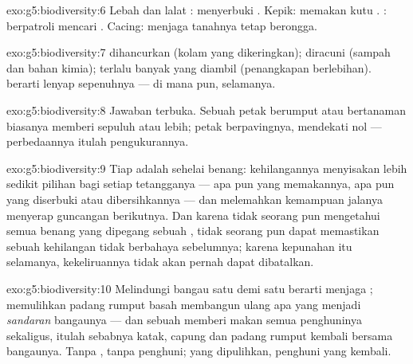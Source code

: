 \begin{solution}{exo:g5:biodiversity:6}
Lebah dan lalat : menyerbuki . Kepik: memakan kutu
. : berpatroli mencari . Cacing: menjaga tanahnya
tetap berongga.
\end{solution}

\begin{solution}{exo:g5:biodiversity:7}
 dihancurkan (kolam yang dikeringkan); 
diracuni (sampah dan bahan kimia); terlalu banyak yang diambil
(penangkapan  berlebihan).  berarti lenyap sepenuhnya ---
di mana pun, selamanya.
\end{solution}

\begin{solution}{exo:g5:biodiversity:8}
Jawaban terbuka. Sebuah petak berumput atau bertanaman biasanya
memberi sepuluh  atau lebih; petak berpavingnya, mendekati nol
--- perbedaannya itulah pengukurannya.
\end{solution}

\begin{solution}{exo:g5:biodiversity:9}
Tiap  adalah sehelai benang: kehilangannya menyisakan lebih
sedikit pilihan bagi setiap tetangganya --- apa pun yang memakannya,
apa pun yang diserbuki atau dibersihkannya --- dan melemahkan
kemampuan jalanya menyerap guncangan berikutnya. Dan karena tidak
seorang pun mengetahui semua benang yang dipegang sebuah ,
tidak seorang pun dapat memastikan sebuah kehilangan tidak berbahaya
sebelumnya; karena kepunahan itu selamanya, kekeliruannya tidak akan
pernah dapat dibatalkan.
\end{solution}

\begin{solution}{exo:g5:biodiversity:10}
Melindungi bangau satu demi satu berarti menjaga ; memulihkan
padang rumput basah membangun ulang apa yang menjadi \emph{sandaran}
bangaunya --- dan sebuah  memberi makan semua penghuninya
sekaligus, itulah sebabnya katak, capung dan  padang rumput
kembali bersama bangaunya. Tanpa , tanpa penghuni;  yang
dipulihkan, penghuni yang kembali.
\end{solution}

